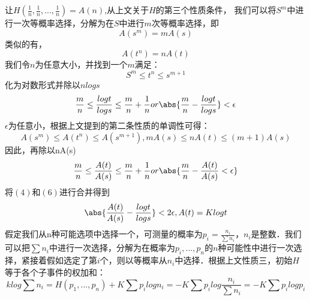 让$H(\frac{1}{n},\frac{1}{n},...,\frac{1}{n})=A(n)$,从上文关于$H$的第三个性质条件，
我们可以将$S^m$中进行一次等概率选择，分解为在$S$中进行$m$次等概率选择，即
\begin{equation}
A(s^m)=mA(s)
\end{equation}
类似的有，
\begin{equation}
A(t^n)=nA(t)
\end{equation}
我们令$n$为任意大小，并找到一个$m$满足：
\begin{equation}
S^m\leq t^n\leq s^{m+1}
\end{equation}
化为对数形式并除以$nlogs$
\begin{equation}
\frac{m}{n}\leq \frac{logt}{logs}\leq \frac{m}{n}+\frac{1}{n} or \abs{\frac{m}{n}-\frac{logt}{logs}}< \epsilon
\end{equation}
$\epsilon$为任意小，根据上文提到的第二条性质的单调性可得：
\begin{equation}
A(s^m)\leq A(t^n) \leq A(s^{m+1}), mA(s)\leq nA(t) \leq (m+1)A(s)
\end{equation}
因此，再除以nA(s)
\begin{equation}
\frac{m}{n}\leq \frac{A(t)}{A(s)}\leq \frac{m}{n}+\frac{1}{n} or \abs{\frac{m}{n} -\frac{A(t)}{A(s)} <\epsilon}
\end{equation}
将$(4)$和$(6)$进行合并得到
\begin{equation}
\abs{\frac{A(t)}{A(s)} - \frac{logt}{logs}} <2\epsilon ,A(t)=Klogt
\end{equation}
假定我们从n种可能选项中选择一个，可测量的概率为$p_i=\frac{n_i}{\sum n_i}$，$n_i$是整数．我们可以把$\sum{n_i}$中进行一次选择，分解为在概率为$p_i,...,p_n$的$n$种可能性中进行一次选择，紧接着假如选定了第$i$个，则以等概率从$n_i$中选择．根据上文性质三，初始$H$等于各个子事件的权加和：
\begin{equation}
klog\sum n_i=H(p_1,...,p_n)+K\sum {p_ilogn_i}=-K\sum {p_ilog\frac{n_i}{\sum n_i}}=-K\sum {p_ilogp_i}
\end{equation}
